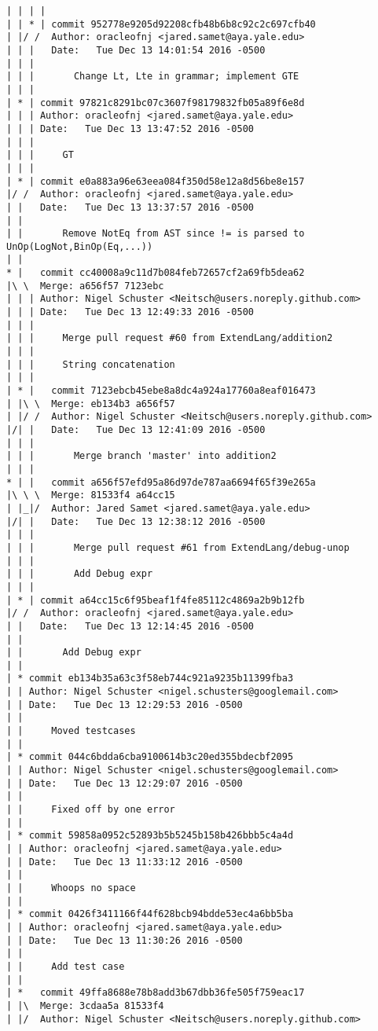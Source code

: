 \begin{lstlisting}
| | | |     
| | * | commit 952778e9205d92208cfb48b6b8c92c2c697cfb40
| |/ /  Author: oracleofnj <jared.samet@aya.yale.edu>
| | |   Date:   Tue Dec 13 14:01:54 2016 -0500
| | |   
| | |       Change Lt, Lte in grammar; implement GTE
| | |    
| * | commit 97821c8291bc07c3607f98179832fb05a89f6e8d
| | | Author: oracleofnj <jared.samet@aya.yale.edu>
| | | Date:   Tue Dec 13 13:47:52 2016 -0500
| | | 
| | |     GT
| | |    
| * | commit e0a883a96e63eea084f350d58e12a8d56be8e157
|/ /  Author: oracleofnj <jared.samet@aya.yale.edu>
| |   Date:   Tue Dec 13 13:37:57 2016 -0500
| |   
| |       Remove NotEq from AST since != is parsed to UnOp(LogNot,BinOp(Eq,...))
| |     
* |   commit cc40008a9c11d7b084feb72657cf2a69fb5dea62
|\ \  Merge: a656f57 7123ebc
| | | Author: Nigel Schuster <Neitsch@users.noreply.github.com>
| | | Date:   Tue Dec 13 12:49:33 2016 -0500
| | | 
| | |     Merge pull request #60 from ExtendLang/addition2
| | |     
| | |     String concatenation
| | |      
| * |   commit 7123ebcb45ebe8a8dc4a924a17760a8eaf016473
| |\ \  Merge: eb134b3 a656f57
| |/ /  Author: Nigel Schuster <Neitsch@users.noreply.github.com>
|/| |   Date:   Tue Dec 13 12:41:09 2016 -0500
| | |   
| | |       Merge branch 'master' into addition2
| | |      
* | |   commit a656f57efd95a86d97de787aa6694f65f39e265a
|\ \ \  Merge: 81533f4 a64cc15
| |_|/  Author: Jared Samet <jared.samet@aya.yale.edu>
|/| |   Date:   Tue Dec 13 12:38:12 2016 -0500
| | |   
| | |       Merge pull request #61 from ExtendLang/debug-unop
| | |       
| | |       Add Debug expr
| | |    
| * | commit a64cc15c6f95beaf1f4fe85112c4869a2b9b12fb
|/ /  Author: oracleofnj <jared.samet@aya.yale.edu>
| |   Date:   Tue Dec 13 12:14:45 2016 -0500
| |   
| |       Add Debug expr
| |   
| * commit eb134b35a63c3f58eb744c921a9235b11399fba3
| | Author: Nigel Schuster <nigel.schusters@googlemail.com>
| | Date:   Tue Dec 13 12:29:53 2016 -0500
| | 
| |     Moved testcases
| |   
| * commit 044c6bdda6cba9100614b3c20ed355bdecbf2095
| | Author: Nigel Schuster <nigel.schusters@googlemail.com>
| | Date:   Tue Dec 13 12:29:07 2016 -0500
| | 
| |     Fixed off by one error
| |   
| * commit 59858a0952c52893b5b5245b158b426bbb5c4a4d
| | Author: oracleofnj <jared.samet@aya.yale.edu>
| | Date:   Tue Dec 13 11:33:12 2016 -0500
| | 
| |     Whoops no space
| |   
| * commit 0426f3411166f44f628bcb94bdde53ec4a6bb5ba
| | Author: oracleofnj <jared.samet@aya.yale.edu>
| | Date:   Tue Dec 13 11:30:26 2016 -0500
| | 
| |     Add test case
| |     
| *   commit 49ffa8688e78b8add3b67dbb36fe505f759eac17
| |\  Merge: 3cdaa5a 81533f4
| |/  Author: Nigel Schuster <Neitsch@users.noreply.github.com>

\end{lstlisting}
